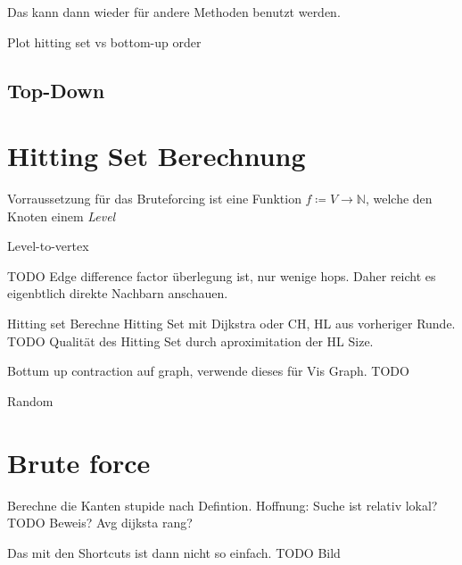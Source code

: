 Das kann dann wieder für andere Methoden benutzt werden.

Plot hitting set vs bottom-up order


\subsection{Top-Down}



\section{Hitting Set Berechnung}
Vorraussetzung für das Bruteforcing ist eine Funktion $f \coloneq V \to \mathbb{N}$, welche den Knoten einem \emph{Level}

Level-to-vertex

TODO Edge difference factor
überlegung ist, nur wenige hops. Daher reicht es eigenbtlich direkte Nachbarn anschauen.

Hitting set
Berechne Hitting Set mit Dijkstra oder CH, HL aus vorheriger Runde.
TODO Qualität des Hitting Set durch aproximitation der HL Size.

Bottum up contraction auf graph, verwende dieses für Vis Graph.
TODO

Random


\section{Brute force}

Berechne die Kanten stupide nach Defintion. Hoffnung: Suche ist relativ lokal? TODO Beweis? Avg dijksta rang?

Das mit den Shortcuts ist dann nicht so einfach. TODO Bild

